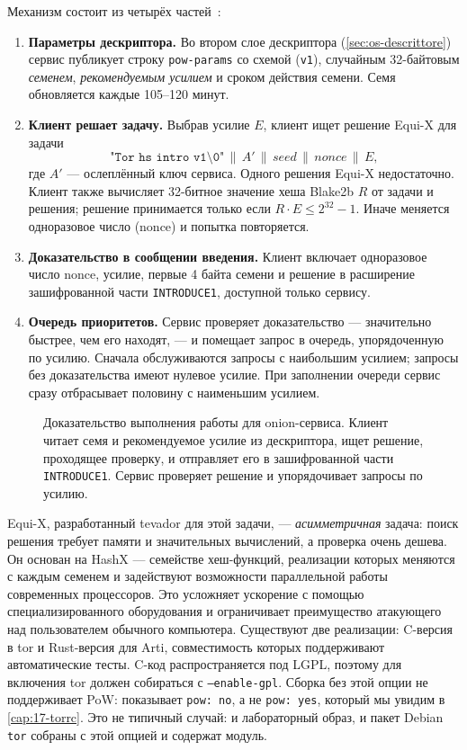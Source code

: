 Механизм состоит из четырёх частей~:
\begin{enumerate}
  \item \textbf{Параметры дескриптора.} Во втором слое дескриптора (\cref{sec:os-descrittore}) сервис публикует строку \texttt{pow-params} со схемой (\texttt{v1}), случайным 32-байтовым \emph{семенем}, \emph{рекомендуемым усилием} и сроком действия семени. Семя обновляется каждые 105--120 минут.
  \item \textbf{Клиент решает задачу.} Выбрав усилие $E$, клиент ищет решение Equi-X для задачи
  \[ \texttt{"Tor hs intro v1\textbackslash 0"} \,\|\, A' \,\|\, \mathit{seed} \,\|\, \mathit{nonce} \,\|\, E, \]
  где $A'$ --- ослеплённый ключ сервиса. Одного решения Equi-X недостаточно. Клиент также вычисляет 32-битное значение хеша Blake2b $R$ от задачи и решения; решение принимается только если $R \cdot E \le 2^{32} - 1$. Иначе меняется одноразовое число (nonce) и попытка повторяется.
  \item \textbf{Доказательство в сообщении введения.} Клиент включает одноразовое число nonce, усилие, первые 4 байта семени и решение в расширение зашифрованной части \texttt{INTRODUCE1}, доступной только сервису.
  \item \textbf{Очередь приоритетов.} Сервис проверяет доказательство --- значительно быстрее, чем его находят, --- и помещает запрос в очередь, упорядоченную по усилию. Сначала обслуживаются запросы с наибольшим усилием; запросы без доказательства имеют нулевое усилие. При заполнении очереди сервис сразу отбрасывает половину с наименьшим усилием.
\end{enumerate}

\begin{figure}[htbp]
\centering

\caption{Доказательство выполнения работы для onion-сервиса. Клиент читает семя и рекомендуемое усилие из дескриптора, ищет решение, проходящее проверку, и отправляет его в зашифрованной части \texttt{INTRODUCE1}. Сервис проверяет решение и упорядочивает запросы по усилию.}
\label{fig:pow}
\end{figure}

\begin{approfondimento}
Equi-X, разработанный tevador для этой задачи, --- \emph{асимметричная} задача: поиск решения требует памяти и значительных вычислений, а проверка очень дешева. Он основан на HashX --- семействе хеш-функций, реализации которых меняются с каждым семенем и задействуют возможности параллельной работы современных процессоров. Это усложняет ускорение с помощью специализированного оборудования и ограничивает преимущество атакующего над пользователем обычного компьютера. Существуют две реализации: C-версия в tor и Rust-версия для Arti, совместимость которых поддерживают автоматические тесты. C-код распространяется под LGPL, поэтому для включения tor должен собираться с \texttt{--enable-gpl}. Сборка без этой опции не поддерживает PoW:  показывает \texttt{pow: no}, а не \texttt{pow: yes}, который мы увидим в \cref{cap:17-torrc}. Это не типичный случай: и лабораторный образ, и пакет Debian \texttt{tor} собраны с этой опцией и содержат модуль.
\end{approfondimento}

